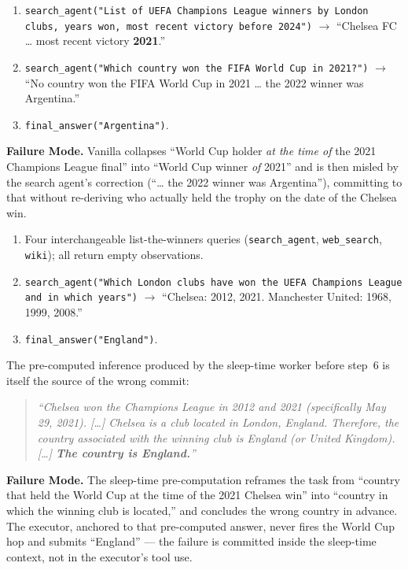 \begin{tcolorbox}[colback=red!4, colframe=red!60!black, title=\textsc{Vanilla} (Pred: Argentina / GT: France), fontupper=\small, breakable]
\begin{enumerate}
  \item \texttt{search\_agent("List of UEFA Champions League winners by London clubs, years won, most recent victory before 2024")} $\rightarrow$ ``Chelsea FC \dots {} most recent victory \textbf{2021}.''
  \item \texttt{search\_agent("Which country won the FIFA World Cup in 2021?")} $\rightarrow$ ``No country won the FIFA World Cup in 2021 \dots{} the 2022 winner was Argentina.''
  \item \texttt{final\_answer("Argentina")}.
\end{enumerate}
\textbf{Failure Mode.} Vanilla collapses ``World Cup holder \emph{at the time of} the 2021 Champions League final'' into ``World Cup winner \emph{of} 2021'' and is then misled by the search agent's correction (``\dots{} the 2022 winner was Argentina''), committing to that without re-deriving who actually held the trophy on the date of the Chelsea win.
\end{tcolorbox}

\begin{tcolorbox}[colback=orange!5, colframe=orange!70!black, title=\textsc{Sleep-Time Compute} (Pred: England / GT: France), fontupper=\small, breakable]
\begin{enumerate}
  \item[1-4.] Four interchangeable list-the-winners queries (\texttt{search\_agent}, \texttt{web\_search}, \texttt{wiki}); all return empty observations.
  \item[5.] \texttt{search\_agent("Which London clubs have won the UEFA Champions League and in which years")} $\rightarrow$ ``Chelsea: 2012, 2021. Manchester United: 1968, 1999, 2008.''
  \item[6.] \texttt{final\_answer("England")}.
\end{enumerate}
The pre-computed inference produced by the sleep-time worker before step~6 is itself the source of the wrong commit:
\begin{quote}\small
\textit{``Chelsea won the Champions League in 2012 and 2021 (specifically May 29, 2021). [\dots] Chelsea is a club located in London, England. Therefore, the country associated with the winning club is England (or United Kingdom). [\dots] \textbf{The country is England.}''}
\end{quote}
\textbf{Failure Mode.} The sleep-time pre-computation reframes the task from ``country that held the World Cup at the time of the 2021 Chelsea win'' into ``country in which the winning club is located,'' and concludes the wrong country in advance. The executor, anchored to that pre-computed answer, never fires the World Cup hop and submits ``England'' --- the failure is committed inside the sleep-time context, not in the executor's tool use.
\end{tcolorbox}

